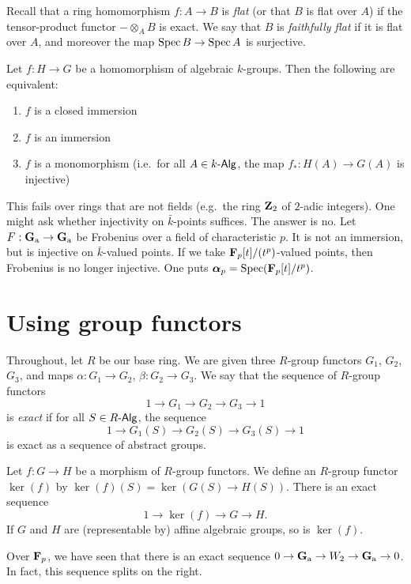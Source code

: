 \documentclass{article}
\begin{document}
Recall that a ring homomorphism $f:A\to B$ is \emph{flat} (or that $B$ is flat 
over $A$) if the tensor-product functor $-\otimes_A B$ is exact. We say that $B$ 
is \emph{faithfully flat} if it is flat over $A$, and moreover the map 
$\operatorname{Spec} B \to \operatorname{Spec} A$ is surjective. 

\begin{proposition}
Let $f:H\to G$ be a homomorphism of algebraic $k$-groups. Then the following are 
equivalent: 
\begin{enumerate}
  \item $f$ is a closed immersion
  \item $f$ is an immersion 
  \item $f$ is a monomorphism (i.e.\ for all $A\in k\text{-}\mathsf{Alg}$, the map 
    $f_\ast:H(A) \to G(A)$ is injective)
\end{enumerate}
\end{proposition}

This fails over rings that are not fields (e.g.\ the ring $\mathbf{Z}_2$ of $2$-adic 
integers). One might ask whether injectivity on $\bar k$-points suffices. The 
answer is no. Let $F:\mathbf{G}_{\mathrm{a}} \to \mathbf{G}_{\mathrm{a}}$ be Frobenius over a field 
of characteristic $p$. It is not an immersion, but is injective on 
$\bar k$-valued points. If we take $\mathbf{F}_p[t]/(t^p)$-valued points, then 
Frobenius is no longer injective. One puts 
$\boldsymbol\alpha_p = \operatorname{Spec}(\mathbf{F}_p[t]/t^p)$. 





\section{Using group functors}

Throughout, let $R$ be our base ring. We are given three $R$-group functors 
$G_1$, $G_2$, $G_3$, and maps 
$\alpha:G_1 \to G_2$, $\beta:G_2 \to G_3$. We say that the sequence of $R$-group 
functors 
\[
  1 \to G_1 \to G_2 \to G_3 \to 1 
\]
is \emph{exact} if for all $S\in R\text{-}\mathsf{Alg}$, the sequence 
\[
  1 \to G_1(S) \to G_2(S) \to G_3(S) \to 1 
\]
is exact as a sequence of abstract groups. 

Let $f:G\to H$ be a morphism of $R$-group functors. We define an $R$-group 
functor $\ker(f)$ by $\ker(f)(S)=\ker(G(S) \to H(S))$. There is an exact sequence 
\[
  1 \to \ker(f) \to G \to H .
\]
If $G$ and $H$ are (representable by) affine algebraic groups, so is $\ker(f)$. 

\begin{example}
Over $\mathbf{F}_p$, we have seen that there is an exact sequence 
$0 \to \mathbf{G}_{\mathrm{a}} \to W_2 \to \mathbf{G}_{\mathrm{a}} \to 0$. In fact, this sequence 
splits on the right. 
\end{example}
\end{document}
